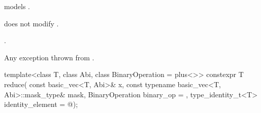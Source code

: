 \begin{itemdescr}
\pnum
\constraints
{} models
.

\pnum
\expects
{} does not modify .

\pnum
\returns
{}.

\pnum
\throws
Any exception thrown from .
\end{itemdescr}

\begin{itemdecl}
template<class T, class Abi, class BinaryOperation = plus<>>
  constexpr T reduce(
    const basic_vec<T, Abi>& x, const typename basic_vec<T, Abi>::mask_type& mask,
    BinaryOperation binary_op = {}, type_identity_t<T> identity_element = @\seebelow@);
\end{itemdecl}

